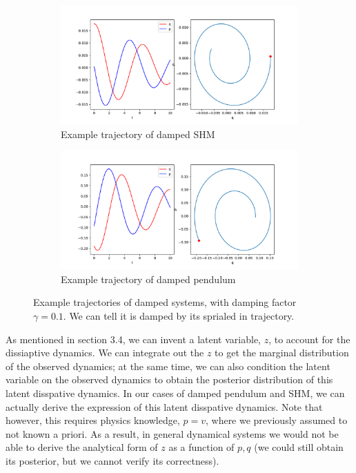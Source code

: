\documentclass{statsmsc}
\begin{document}
\begin{figure}[H]
     \centering
     \begin{subfigure}[b]{\linewidth}
        \centering
        \includegraphics[width=0.5\linewidth]{../codes/figures/damped_shm_trajectory_1D.pdf}
        \caption{Example trajectory of damped SHM}
        \label{fig:damped_shm_trajectory}
     \end{subfigure}
     \hfill
     \begin{subfigure}[b]{\linewidth}
        \centering
        \includegraphics[width=0.5\linewidth]{../codes/figures/damped_pendulum_trajectory_1D.pdf}
        \caption{Example trajectory of damped pendulum}
        \label{fig:damped_pendulum_trajectory}
     \end{subfigure}
        \caption{Example trajectories of damped systems, with damping factor $\gamma=0.1$. We can tell it is damped by its sprialed in trajectory.}
        \label{fig:damped_trajectory}
\end{figure}

As mentioned in section 3.4, we can invent a latent variable, $z$, to account for the dissiaptive dynamics.
We can integrate out the $z$ to get the marginal distribution of the observed dynamics; at the same time, we can also condition the latent variable on the observed dynamics to obtain the posterior distribution of this latent disspative dynamics.
In our cases of damped pendulum and SHM, we can actually derive the expression of this latent disspative dynamics. 
Note that however, this requires physics knowledge, $p=v$, where we previously assumed to not known a priori.
As a result, in general dynamical systems we would not be able to derive the analytical form of $z$ as a function of $p, q$ (we could still obtain its posterior, but we cannot verify its correctness).
\end{document}
